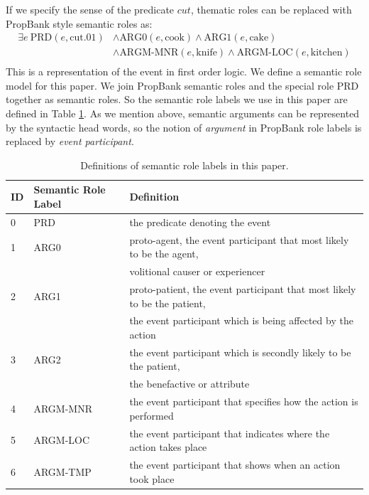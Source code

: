 \documentclass[a4paper]{article}
\begin{document}
If we specify the sense of the predicate $cut$, thematic roles can be replaced with PropBank style semantic roles as: 
\begin{equation*} \label{eg:symbolic-semantic}
\begin{aligned}
    \exists e\ \text{PRD}(e, \text{cut.01})
    & \land \text{ARG0}(e, \text{cook}) \land \text{ARG1}(e, \text{cake}) \\
    & \land \text{ARGM-MNR}(e, \text{knife}) \land \text{ARGM-LOC}(e, \text{kitchen}) \\
\end{aligned}
\end{equation*}
This is a representation of the event in first order logic. We define a semantic role model for this paper. We join PropBank semantic roles and the special role PRD together as semantic roles. So the semantic role labels we use in this paper are defined in Table \ref{tab:semantic}. As we mention above, semantic arguments can be represented by the syntactic head words, so the notion of \textit{argument} in PropBank role labels is replaced by \textit{event participant}. 

% 
% 

\begin{table}[t]
\centering
\begin{tabular}{l|l|l} 
\hline
\textbf{ID} &   \textbf{Semantic Role Label}    &   \textbf{Definition} \\  \hline
0           & PRD       &   the predicate denoting the event \\ \hline
1           & ARG0      &   proto-agent, the event participant that most likely to be the agent, \\     &&   volitional causer or experiencer \\ \hline
2           & ARG1      &   proto-patient, the event participant that most likely to be the patient, \\ &&   the event participant which is being affected by the action \\ \hline
3           & ARG2      &   the event participant which is secondly likely to be the patient,  \\       &&   the benefactive or attribute \\ \hline
4           & ARGM-MNR  &   the event participant that specifies how the action is performed \\ \hline
5           & ARGM-LOC  &   the event participant that indicates where the action takes place \\ \hline
6           & ARGM-TMP  &   the event participant that shows when an action took place \\ \hline
\end{tabular}
\caption{\label{tab:semantic} Definitions of semantic role labels in this paper.}
\end{table}
\end{document}
